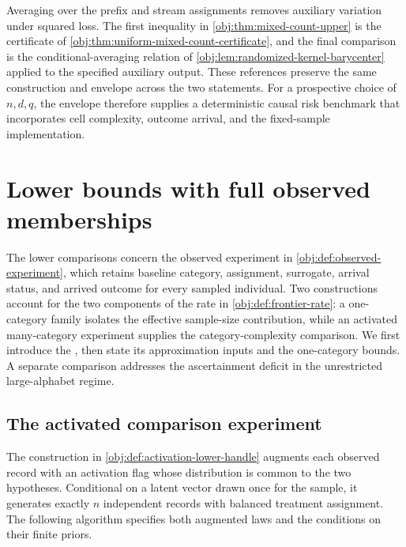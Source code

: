 \documentclass[11pt]{article}
\begin{document}
Averaging over the prefix and stream assignments removes auxiliary variation under squared loss. The first inequality in \cref{obj:thm:mixed-count-upper} is the certificate of \cref{obj:thm:uniform-mixed-count-certificate}, and the final comparison is the conditional-averaging relation of \cref{obj:lem:randomized-kernel-barycenter} applied to the specified auxiliary output. These references preserve the same construction and envelope across the two statements. For a prospective choice of \(n,d,q\), the envelope therefore supplies a deterministic causal risk benchmark that incorporates cell complexity, outcome arrival, and the fixed-sample implementation.


\section{Lower bounds with full observed memberships}

The lower comparisons concern the observed experiment in \cref{obj:def:observed-experiment}, which retains baseline category, assignment, surrogate, arrival status, and arrived outcome for every sampled individual. Two constructions account for the two components of the rate in \cref{obj:def:frontier-rate}: a one-category family isolates the effective sample-size contribution, while an activated many-category experiment supplies the category-complexity comparison. We first introduce the , then state its approximation inputs and the one-category bounds. A separate comparison addresses the ascertainment deficit in the unrestricted large-alphabet regime.

\subsection{The activated comparison experiment}

The construction in \cref{obj:def:activation-lower-handle} augments each observed record with an activation flag whose distribution is common to the two hypotheses. Conditional on a latent vector drawn once for the sample, it generates exactly \(n\) independent records with balanced treatment assignment. The following algorithm specifies both augmented laws and the conditions on their finite priors.
\end{document}
